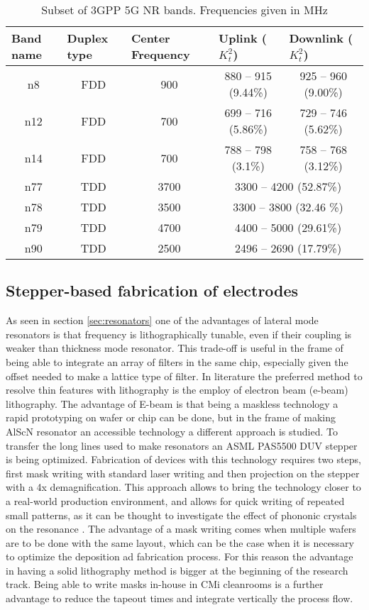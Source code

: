 \begin{table}[]
	\begin{tabular}{@{}ccccc@{}}
		\toprule
		\multicolumn{1}{l}{Band name} & \multicolumn{1}{l}{Duplex type} & \multicolumn{1}{l}{Center Frequency} & \multicolumn{1}{l}{Uplink ($K_t^2$)} & \multicolumn{1}{l}{Downlink ($K_t^2$)} \\ \midrule
		n8 & FDD & 900 & 880 – 915 (9.44\%) & 925 – 960 (9.00\%) \\
		n12 & FDD & 700 & 699 – 716 (5.86\%) & 729 – 746 (5.62\%) \\
		n14 & FDD & 700 & 788 – 798 (3.1\%) & 758 – 768 (3.12\%) \\
		n77 & TDD & 3700 & \multicolumn{2}{c}{3300 – 4200 (52.87\%)} \\
		n78 & TDD & 3500 & \multicolumn{2}{c}{3300 – 3800 (32.46 \%)} \\
		n79 & TDD & 4700 & \multicolumn{2}{c}{4400 – 5000 (29.61\%)} \\
		n90 & TDD & 2500 & \multicolumn{2}{c}{2496 – 2690 (17.79\%)} \\ \bottomrule
	\end{tabular}
	\caption{Subset of 3GPP 5G NR bands. Frequencies given in MHz}
	\label{tab:bands}
\end{table}

\subsection{Stepper-based fabrication of electrodes}
As seen in section \ref{sec:resonators} one of the advantages of lateral mode resonators is that frequency is lithographically tunable, even if their coupling is weaker than thickness mode resonator. This trade-off is useful in the frame of being able to integrate an array of filters in the same chip, especially given the offset needed to make a lattice type of filter. In literature \cite{schaffer_investigation_2020} \cite{schaffer_super_2020} the preferred method to resolve thin features with lithography is the employ of electron beam (e-beam) lithography. The advantage of E-beam is that being a maskless technology a rapid prototyping on wafer or chip can be done, but in the frame of making AlScN resonator an accessible technology a different approach is studied. To transfer the long lines used to make resonators an ASML PAS5500 DUV stepper is being optimized. Fabrication of devices with this technology requires two steps, first mask writing with standard  
laser writing and then projection on the stepper with a 4x demagnification. This approach allows to bring the technology closer to a real-world production environment, and allows for quick writing of repeated small patterns, as it can be thought to investigate the effect of phononic crystals on the resonance \cite{kuo_fractal_2011}. The advantage of a mask writing comes when multiple wafers are to be done with the same layout, which can be the case when it is necessary to optimize the deposition ad fabrication process. For this reason the advantage in having a solid lithography method is bigger at the beginning of the research track. Being able to write masks in-house in CMi cleanrooms is a further advantage to reduce the tapeout times and integrate vertically the process flow. 

